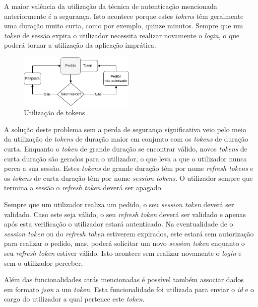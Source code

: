 A maior valência da utilização da técnica de autenticação mencionada anteriormente é a segurança. Isto acontece porque estes \textit{tokens} têm geralmente uma duração muito curta, como por exemplo, quinze minutos. Sempre que um \textit{token} de sessão expira o utilizador necessita realizar novamente o \textit{login}, o que poderá tornar a utilização da aplicação imprática.

\begin{figure}[htb]
  \centering
  \includegraphics[width=0.5\textwidth]{images/implementacao/api/jwt_session.png}
  \caption{Utilização de tokens}
  \label{fig:64}
 \end{figure}

A solução deste problema sem a perda de segurança significativa veio pelo meio da utilização de \textit{tokens} de duração maior em conjunto com os \textit{tokens} de duração curta. Enquanto o \textit{token} de grande duração se encontrar válido, novos \textit{tokens} de curta duração são gerados para o utilizador, o que leva a que o utilizador nunca perca a sua sessão. Estes \textit{tokens} de grande duração têm por nome \textit{refresh tokens} e os \textit{tokens} de curta duração têm por nome \textit{session tokens}. O utilizador sempre que termina a sessão o \textit{refresh token} deverá ser apagado.

Sempre que um utilizador realiza um pedido, o seu \textit{session token} deverá ser validado. Caso este seja válido, o seu \textit{refresh token} deverá ser validado e apenas após esta verificação o utilizador estará autenticado. Na eventualidade de o \textit{session token} ou do \textit{refresh token} estiverem expirados, este estará sem autorização para realizar o pedido, mas, poderá solicitar um novo \textit{session token} enquanto o seu \textit{refresh token} estiver válido. Isto acontece sem realizar novamente o \textit{login} e sem o utilizador perceber.

 Além das funcionalidades atrás mencionadas é possível também associar dados em formato \textit{\acrshort{json}} a um \textit{token}. Esta funcionalidade foi utilizada para enviar o \textit{id} e o cargo do utilizador a qual pertence este \textit{token}.

